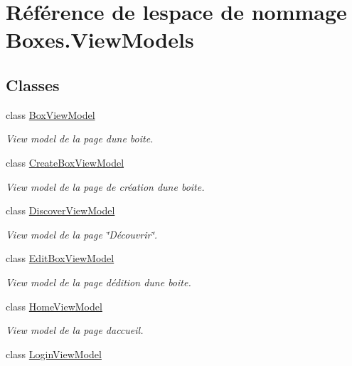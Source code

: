 \hypertarget{namespace_boxes_1_1_view_models}{}\section{Référence de l\textquotesingle{}espace de nommage Boxes.\+View\+Models}
\label{namespace_boxes_1_1_view_models}
\subsection*{Classes}
\begin{DoxyCompactItemize}
\item 
class \hyperlink{class_boxes_1_1_view_models_1_1_box_view_model}{Box\+View\+Model}
\begin{DoxyCompactList}\small\item\em View model de la page d\textquotesingle{}une boite. \end{DoxyCompactList}\item 
class \hyperlink{class_boxes_1_1_view_models_1_1_create_box_view_model}{Create\+Box\+View\+Model}
\begin{DoxyCompactList}\small\item\em View model de la page de création d\textquotesingle{}une boite. \end{DoxyCompactList}\item 
class \hyperlink{class_boxes_1_1_view_models_1_1_discover_view_model}{Discover\+View\+Model}
\begin{DoxyCompactList}\small\item\em View model de la page \char`\"{}\+Découvrir\char`\"{}. \end{DoxyCompactList}\item 
class \hyperlink{class_boxes_1_1_view_models_1_1_edit_box_view_model}{Edit\+Box\+View\+Model}
\begin{DoxyCompactList}\small\item\em View model de la page d\textquotesingle{}édition d\textquotesingle{}une boite. \end{DoxyCompactList}\item 
class \hyperlink{class_boxes_1_1_view_models_1_1_home_view_model}{Home\+View\+Model}
\begin{DoxyCompactList}\small\item\em View model de la page d\textquotesingle{}accueil. \end{DoxyCompactList}\item 
class \hyperlink{class_boxes_1_1_view_models_1_1_login_view_model}{Login\+View\+Model}

\end{DoxyCompactItemize}
